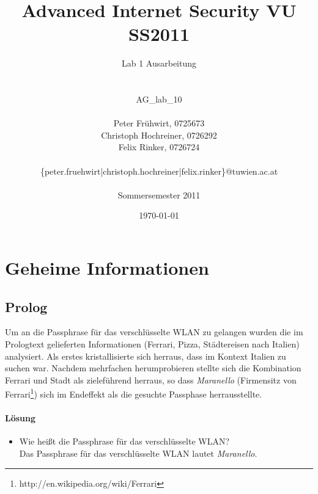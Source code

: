 \documentclass[12pt]{article}
\title{Advanced Internet Security VU SS2011}
\author{
	Lab 1 Ausarbeitung\\
	\\
	\\
	AG\_lab\_10\\
	\\
	Peter Fr\"uhwirt, 0725673  \\
	Christoph Hochreiner, 0726292 \\
	Felix Rinker, 0726724 \\
	\\
	\{peter.fruehwirt|christoph.hochreiner|felix.rinker\}@tuwien.ac.at\\
	\\
	Sommersemester 2011
}
\date{\today}
\begin{document}
\maketitle

\newpage
\tableofcontents
\newpage
\listoffigures

\lstlistoflistings
\newpage

\section{Geheime Informationen}

\subsection{Prolog}

Um an die Passphrase für das verschlüsselte WLAN zu gelangen wurden die im Prologtext gelieferten Informationen (Ferrari, Pizza, Städtereisen nach Italien) analysiert. Als erstes kristallisierte sich herraus, dass im Kontext Italien zu suchen war. Nachdem mehrfachen herumprobieren stellte sich die Kombination Ferrari und Stadt als zieleführend herraus, so dass \textit{Maranello} (Firmensitz von Ferrari\footnote{http://en.wikipedia.org/wiki/Ferrari}) sich im Endeffekt als die gesuchte Passphase herrausstellte.

\paragraph{Lösung}
\begin{itemize}
	\item Wie heißt die Passphrase für das verschlüsselte WLAN? \\
		Das  Passphrase für das verschlüsselte WLAN lautet \textit{Maranello}.
\end{itemize}
\end{document}
